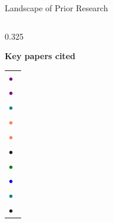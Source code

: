 \documentclass[aspectratio=169, 10pt]{beamer}
\begin{document}
\begin{frame}{Landscape of Prior Research}
\begin{columns}[T]
    \begin{column}{0.325\textwidth}
      \begin{tcolorbox}[enhanced, colback=GrayL, colframe=Border,
        boxrule=0.4pt, arc=3pt, left=5pt, right=5pt, top=5pt, bottom=5pt]
        \centering
        \textbf{\color{DarkText}\small Key papers cited}\\[4pt]
        \footnotesize
        \begin{tabular}{@{}l@{}}
          \textcolor{Purple}{$\bullet$}~\cite{mirage2025}\\[2pt]
          \textcolor{Purple}{$\bullet$}~\cite{agmmu2025}\\[2pt]
          \textcolor{Teal}{$\bullet$}~\cite{farmerchat2024}\\[2pt]
          \textcolor{Coral}{$\bullet$}~\cite{llmicdp2025}\\[2pt]
          \textcolor{Coral}{$\bullet$}~\cite{agrichain2025}\\[2pt]
          \textcolor{Amber}{$\bullet$}~\cite{xaicrop2024}\\[2pt]
          \textcolor{Green}{$\bullet$}~\cite{cropibotSSR2026}\\[2pt]
          \textcolor{Blue}{$\bullet$}~\cite{indicasr2025}\\[2pt]
          \textcolor{Teal}{$\bullet$}~\cite{ragadvLLM2026}\\[2pt]
          \textcolor{Muted}{$\bullet$}~\cite{transformersurvey2024}
        \end{tabular}
      \end{tcolorbox}
    \end{column}
  \end{columns}
\end{frame}
\end{document}

